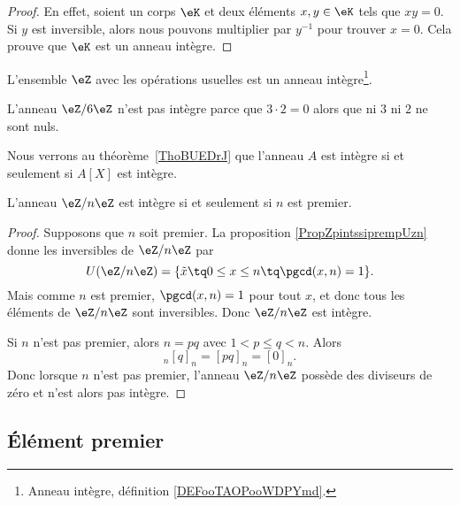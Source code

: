 \begin{proof}
    En effet, soient un corps \( \eK\) et deux éléments \( x,y\in \eK\) tels que \( xy=0\). Si \( y\) est inversible, alors nous pouvons multiplier par \( y^{-1}\) pour trouver \( x=0\). Cela prouve que \( \eK\) est un anneau intègre.
\end{proof}

\begin{example}     \label{EXooLDXRooSxUAXs}
    L'ensemble \( \eZ\) avec les opérations usuelles est un anneau intègre\footnote{Anneau intègre, définition \ref{DEFooTAOPooWDPYmd}.}.
\end{example}

\begin{example}
    L'anneau \( \eZ/6\eZ\) n'est pas intègre parce que \( 3\cdot 2=0\) alors que ni \( 3\) ni \( 2\) ne sont nuls.
\end{example}

Nous verrons au théorème~\ref{ThoBUEDrJ} que l'anneau \( A\) est intègre si et seulement si \( A[X]\) est intègre.

\begin{corollary}   \label{CorZnInternprem}
    L'anneau \( \eZ/n\eZ\) est intègre si et seulement si \( n\) est premier.
\end{corollary}

\begin{proof}
    Supposons que \( n\) soit premier. La proposition \ref{PropZpintssiprempUzn} donne les inversibles de \( \eZ/n\eZ\) par
    \begin{equation}
        U(\eZ/n\eZ)=\{ \tilde x\tq 0\leq x\leq n\tq\pgcd(x,n)=1 \}.
    \end{equation}
    Mais comme \( n\) est premier, \( \pgcd(x,n)=1\) pour tout \( x\), et donc tous les éléments de \( \eZ/n\eZ\) sont inversibles. Donc \( \eZ/n\eZ\) est intègre.

    Si \( n\) n'est pas premier, alors \( n=pq\) avec \( 1<p\leq q<n\). Alors
    \begin{equation}
        [p]_n[q]_n=[pq]_n=[0]_n.
    \end{equation}
    Donc lorsque \( n\) n'est pas premier,  l'anneau \( \eZ/n\eZ\) possède des diviseurs de zéro et n'est alors pas intègre.
\end{proof}


\subsection{Élément premier}

